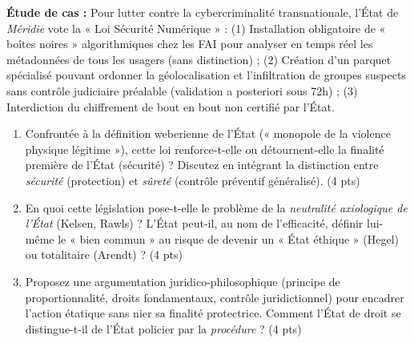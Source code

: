 \documentclass[11pt]{article}
\begin{document}
\begin{exercice}
\textbf{Étude de cas :} Pour lutter contre la cybercriminalité transnationale, l'État de \textit{Méridie} vote la « Loi Sécurité Numérique » : (1) Installation obligatoire de « boîtes noires » algorithmiques chez les FAI pour analyser en temps réel les métadonnées de tous les usagers (sans distinction) ; (2) Création d'un parquet spécialisé pouvant ordonner la géolocalisation et l'infiltration de groupes suspects sans contrôle judiciaire préalable (validation a posteriori sous 72h) ; (3) Interdiction du chiffrement de bout en bout non certifié par l'État.
\begin{enumerate}
    \item Confrontée à la définition weberienne de l'État (« monopole de la violence physique légitime »), cette loi renforce-t-elle ou détournent-elle la finalité première de l'État (sécurité) ? Discutez en intégrant la distinction entre \textit{sécurité} (protection) et \textit{sûreté} (contrôle préventif généralisé). (4 pts)
    \item En quoi cette législation pose-t-elle le problème de la \textit{neutralité axiologique de l'État} (Kelsen, Rawls) ? L'État peut-il, au nom de l'efficacité, définir lui-même le « bien commun » au risque de devenir un « État éthique » (Hegel) ou totalitaire (Arendt) ? (4 pts)
    \item Proposez une argumentation juridico-philosophique (principe de proportionnalité, droits fondamentaux, contrôle juridictionnel) pour encadrer l'action étatique sans nier sa finalité protectrice. Comment l'État de droit se distingue-t-il de l'État policier par la \textit{procédure} ? (4 pts)
\end{enumerate}
\end{exercice}
\end{document}
